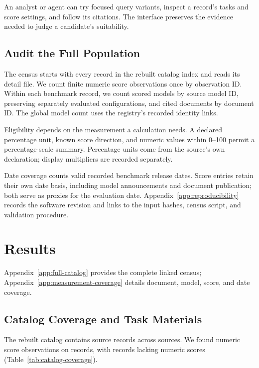 \documentclass[11pt]{article}
\newcommand{\ReportNumber}[1]{\pgfmathprintnumber[fixed,precision=0,1000 sep={,},assume math mode=true]{#1}}
\begin{document}
An analyst or agent can try focused query variants, inspect a record's tasks and score settings, and follow its citations. The interface preserves the evidence needed to judge a candidate's suitability.

\subsection{Audit the Full Population}
\label{sec:census-method}

The census starts with every record in the rebuilt catalog index and reads its detail file. We count finite numeric score observations once by observation ID. Within each benchmark record, we count scored models by source model ID, preserving separately evaluated configurations, and cited documents by document ID. The global model count uses the registry's recorded identity links.

Eligibility depends on the measurement a calculation needs. A declared percentage unit, known score direction, and numeric values within 0--100 permit a percentage-scale summary. Percentage units come from the source's own declaration; display multipliers are recorded separately.

Date coverage counts valid recorded benchmark release dates. Score entries retain their own date basis, including model announcements and document publication; both serve as proxies for the evaluation date. Appendix~\ref{app:reproducibility} records the software revision and links to the input hashes, census script, and validation procedure.

\section{Results}
\label{sec:results}

Appendix~\ref{app:full-catalog} provides the complete linked census; Appendix~\ref{app:measurement-coverage} details document, model, score, and date coverage.

\subsection{Catalog Coverage and Task Materials}

The rebuilt catalog contains \ReportNumber{\ReportCatalogCount} source records across \ReportCatalogSourceCount{} sources. We found \ReportNumber{\CensusNumericScores} numeric score observations on \CensusScored{} records, with \CensusUnscored{} records lacking numeric scores (Table~\ref{tab:catalog-coverage}).
\end{document}
